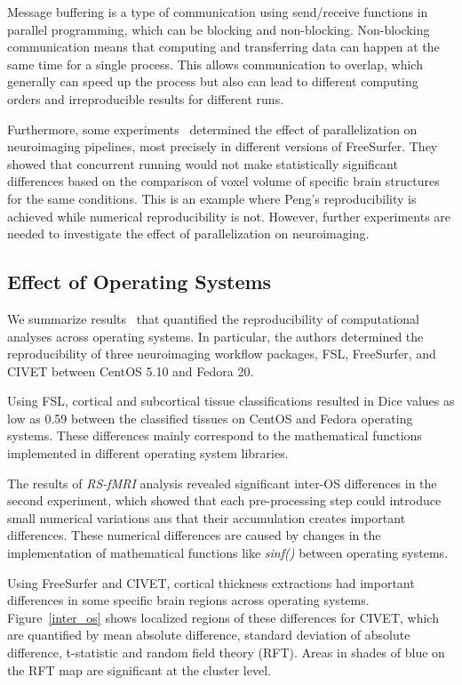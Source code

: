 Message buffering is a type of communication using send/receive 
functions in parallel programming, which can be blocking and 
non-blocking. 
Non-blocking communication means that computing and transferring data can happen at 
the same time for a single process. This allows communication to 
overlap, which generally can speed up the process but also can lead to different computing orders and 
irreproducible results for different runs. 

Furthermore, some experiments~\cite{Gronenschild2012} 
determined the effect of parallelization on neuroimaging pipelines, 
most precisely in different versions of FreeSurfer. 
They showed that concurrent running would not make 
statistically significant differences based on the comparison of voxel 
volume of specific brain structures for the same conditions. This is an 
example where Peng's reproducibility is achieved while numerical 
reproducibility is not.
However, further experiments are needed to investigate the effect of parallelization on neuroimaging.

\subsection{Effect of Operating Systems}

We summarize results~\cite{Glatard2015}
that quantified the reproducibility of computational analyses 
across operating systems. In particular, the authors determined 
the reproducibility of three neuroimaging workflow packages, FSL, 
FreeSurfer, and CIVET between CentOS 5.10 and Fedora 20. 

Using FSL, cortical and subcortical tissue classifications resulted in
Dice values as low as 0.59 between the classified tissues on CentOS 
and Fedora operating systems. These differences mainly correspond to 
the mathematical functions implemented in different operating system 
libraries. 

The results of \emph{RS-fMRI} analysis revealed significant inter-OS 
differences in the second experiment, which showed that each 
pre-processing step could introduce small numerical variations ans that their 
accumulation creates important differences. These numerical differences 
are caused by changes in the implementation of mathematical functions like 
\emph{sinf()} between operating systems.  

Using FreeSurfer and CIVET, cortical thickness extractions
had important differences in some specific brain regions across 
operating systems. Figure~\ref{inter_os} shows localized regions of 
these differences for CIVET, which are quantified by
mean absolute difference, standard deviation of absolute 
difference, t-statistic and random field theory (RFT). 
Areas in shades of blue on the RFT map are significant at the cluster level.

